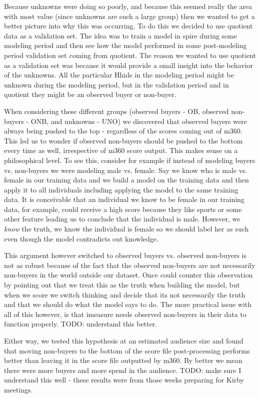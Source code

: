\documentclass[paper=a4, fontsize=11pt]{scrartcl} %
\numberwithin{equation}{section} %
\numberwithin{figure}{section} %
\numberwithin{table}{section} %
\begin{document}
Because unknowns were doing so poorly, and because this seemed really the area with most value (since unknowns are such a large group) then we wanted to get a better picture into why this was occurring. To do this we decided to use quotient data as a validation set. The idea was to train a model in spire during some modeling period and then see how the model performed in some post-modeling period validation set coming from quotient. The reason we wanted to use quotient as a validation set was because it would provide a small insight into the behavior of the unknowns. All the particular Hhids in the modeling period might be unknown during the modeling period, but in the validation period and in quotient they might be an observed buyer or non-buyer.

When considering these different groups (observed buyers - OB, observed non-buyers - ONB, and unknowns - UNO) we discovered that observed buyers were always being pushed to the top - regardless of the scores coming out of m360. This led us to wonder if observed non-buyers should be pushed to the bottom every time as well, irrespective of m360 score output. This makes sense on a philosophical level. To see this, consider for example if instead of modeling buyers vs. non-buyers we were modeling male vs. female. Say we know who is male vs. female in our training data and we build a model on the training data and then apply it to all individuals including applying the model to the same training data. It is conceivable that an individual we know to be female in our training data, for example, could receive a high score because they like sports or some other feature leading us to conclude that the individual is male. However, we \emph{know} the truth, we know the individual is female so we should label her as such even though the model contradicts out knowledge.

This argument however switched to observed buyers vs. observed non-buyers is not as robust because of the fact that the observed non-buyers are not necessarily non-buyers in the world outside our dataset. Once could counter this observation by pointing out that we treat this as the truth when building the model, but when we score we switch thinking and decide that its not necessarily the truth and that we should do what the model says to do. The more practical issue with all of this however, is that imeasure needs observed non-buyers in their data to function properly. TODO: understand this better.

Either way, we tested this hypothesis at an estimated audience size and found that moving non-buyers to the bottom of the score file post-processing performs better than leaving it in the score file outputted by m360. By better we mean there were more buyers and more spend in the audience. TODO: make sure I understand this well - these results were from those weeks preparing for Kirby meetings.
\end{document}
